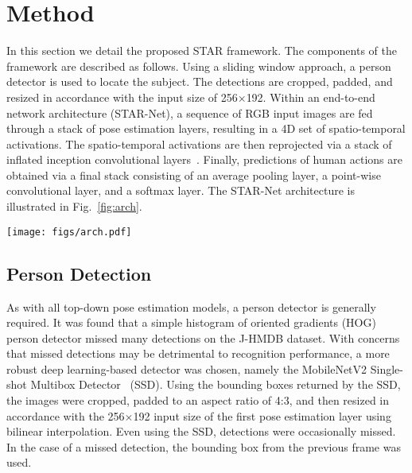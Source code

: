 \documentclass[10pt, conference, compsocconf]{IEEEtran}
\begin{document}
\section{Method}

In this section we detail the proposed STAR framework. The components of the framework are described as follows. Using a sliding window approach, a person detector is used to locate the subject. The detections are cropped, padded, and resized in accordance with the input size of 256$\times$192. Within an end-to-end network architecture (STAR-Net), a sequence of RGB input images are fed through a stack of pose estimation layers, resulting in a 4D set of spatio-temporal activations. The spatio-temporal activations are then reprojected via a stack of inflated inception convolutional layers~\cite{carreira2017quo}. Finally, predictions of human actions are obtained via a final stack consisting of an average pooling layer, a point-wise convolutional layer, and a softmax layer. The STAR-Net architecture is illustrated in Fig.~\ref{fig:arch}.

\begin{figure*}
    \centering
    \texttt{[image: figs/arch.pdf]}
    \vspace{-20pt}
    \caption{STAR-Net. Within an end-to-end network architecture, a sequence of RGB input images are fed through a stack of pose estimation layers, resulting in a 4D set of spatio-temporal activations. The spatio-temporal activations are then reprojected via a stack of inflated inception~\cite{carreira2017quo} convolutional layers.  Finally, predictions of human action are obtained via a final stack consisting of an average pooling layer, a point-wise convolutional layer, and a softmax layer.}
    \label{fig:arch}
\end{figure*}

\subsection{Person Detection}
As with all top-down pose estimation models, a person detector is generally required. It was found that a simple histogram of oriented gradients (HOG) person detector missed many detections on the J-HMDB dataset. With concerns that missed detections may be detrimental to recognition performance, a more robust deep learning-based detector was chosen, namely the MobileNetV2 Single-shot Multibox Detector~\cite{sandler2018mobilenetv2} (SSD). Using the bounding boxes returned by the SSD, the images were cropped, padded to an aspect ratio of 4:3, and then resized in accordance with the 256$\times$192 input size of the first pose estimation layer using bilinear interpolation. Even using the SSD, detections were occasionally missed. In the case of a missed detection, the bounding box from the previous frame was used. 
\end{document}
